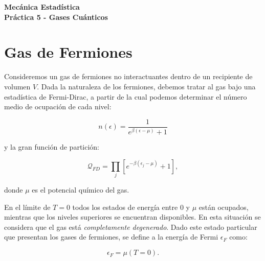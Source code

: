 \documentclass[a4paper,11pt]{article}
\begin{document}
\pagestyle{fancy}
\chead{\small \the\year}



\thispagestyle{plain}
\begin{center}
    \textbf{\large
        Mecánica Estadística \\
        Práctica 5 - Gases Cuánticos
    }
\end{center}
\vspace{-1.5em}




\section{Gas de Fermiones}
\label{sec:gas-de-fermi}

Consideremos un gas de fermiones no interactuantes dentro de un
recipiente de volumen $V$.
Dada la naturaleza de los fermiones, debemos tratar al gas bajo una
estadística de Fermi-Dirac, a partir de la cual podemos determinar el
número medio de ocupación de cada nivel:

$$ n(\epsilon) = \frac{1}{e^{\beta(\epsilon - \mu)} + 1} $$

\noindent y la gran función de partición:

$$
\mathcal{Q}_{FD} =
  \prod_j \left[ e^{-\beta(\epsilon_j - \mu)} + 1\right],
$$

\noindent donde $\mu$ es el potencial químico del gas.

En el límite de $T = 0$ todos los estados de energía entre 0 y $\mu$
están ocupados, mientras que los niveles superiores se encuentran
disponibles.
En esta situación se considera que el gas está \emph{completamente
degenerado}.
Dado este estado particular que presentan los gases de fermiones, se
define a la energía de Fermi $\epsilon_F$ como:

$$ \epsilon_F = \mu(T=0). $$
\end{document}
